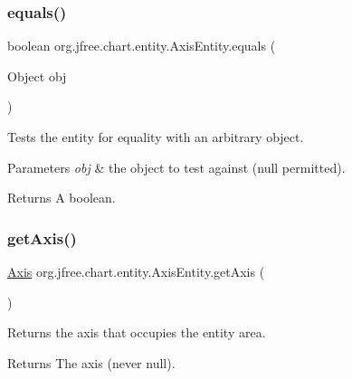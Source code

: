 \subsubsection{\texorpdfstring{equals()}{equals()}}
{\footnotesize\ttfamily boolean org.\+jfree.\+chart.\+entity.\+Axis\+Entity.\+equals (\begin{DoxyParamCaption}\item[{Object}]{obj }\end{DoxyParamCaption})}

Tests the entity for equality with an arbitrary object.


\begin{DoxyParams}{Parameters}
{\em obj} & the object to test against ({\ttfamily null} permitted).\\
\hline
\end{DoxyParams}
\begin{DoxyReturn}{Returns}
A boolean. 
\end{DoxyReturn}
\mbox{\label{classorg_1_1jfree_1_1chart_1_1entity_1_1_axis_entity_aa3fb33fb4490c5d33853003656e03f3c}} 
\subsubsection{\texorpdfstring{get\+Axis()}{getAxis()}}
{\footnotesize\ttfamily \mbox{\hyperlink{classorg_1_1jfree_1_1chart_1_1axis_1_1_axis}{Axis}} org.\+jfree.\+chart.\+entity.\+Axis\+Entity.\+get\+Axis (\begin{DoxyParamCaption}{ }\end{DoxyParamCaption})}

Returns the axis that occupies the entity area.

\begin{DoxyReturn}{Returns}
The axis (never {\ttfamily null}). 
\end{DoxyReturn}
\mbox{\label{classorg_1_1jfree_1_1chart_1_1entity_1_1_axis_entity_a8bc4e803d17aaafaa9d205093b13ec84}} 
